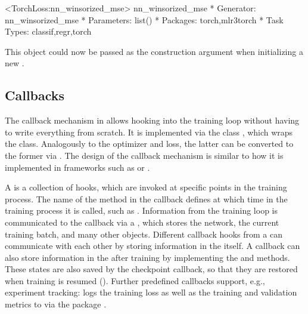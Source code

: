 \documentclass[article,shortnames]{jss}
\theoremstyle{definition}
\renewenvironment{CodeChunk}{\par\addvspace{0.6\baselineskip}\noindent\begin{minipage}{\linewidth}}{\end{minipage}\par\vspace{0.6\baselineskip}}
\begin{document}
\begin{CodeChunk}
\begin{CodeOutput}
<TorchLoss:nn_winsorized_mse> nn_winsorized_mse
* Generator: nn_winsorized_mse
* Parameters: list()
* Packages: torch,mlr3torch
* Task Types: classif,regr,torch
\end{CodeOutput}
\end{CodeChunk}

This object could now be passed as the construction argument  when initializing a new .

\subsection{Callbacks}\label{sec:extending-callbacks}

The callback mechanism in \mlrttorch{} allows hooking into the training loop without having to write everything from scratch.
It is implemented via the  class , which wraps the  class.
Analogously to the optimizer and loss, the latter can be converted to the former via .
The design of the callback mechanism is similar to how it is implemented in frameworks such as \keras{} or \luz{} \citep{ref-chollet2018keras, ref-luz2025}.

A  is a collection of hooks, which are invoked at specific points in the training process.
The name of the method in the callback defines at which time in the training process it is called, such as .
Information from the training loop is communicated to the callback via a , which stores the network, the current training batch, and many other objects.
Different callback hooks from a  can communicate with each other by storing information in the  itself.
A callback can also store information in the  after training by implementing the  and  methods.
These states are also saved by the checkpoint callback, so that they are restored when training is resumed ().
Further predefined callbacks support, e.g., experiment tracking:  logs the training loss as well as the training and validation metrics to  via the  package \citep{ref-tfevents}.
\end{document}
